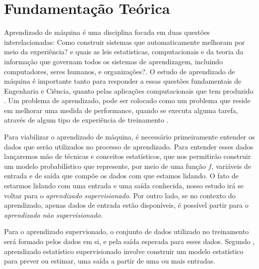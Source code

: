 \chapter{Fundamentação Teórica}

Aprendizado de máquina é uma disciplina focada em duas questões interelacionadas: Como construir sistemas que automaticamente melhoram por meio da experiência? e quais as leis estatisticas,
computacionais e da teoria da informação que governam todos os sistemas de aprendizagem, incluindo computadores, seres humanos, e organizações?. O estudo de aprendizado de máquina é importante tanto
para responder a essas questões fundamentais de Engenharia e Ciência, quanto pelas aplicações computacionais que tem produzido \cite{Jordan}.
Um problema de aprendizado, pode ser colocado como um problema que reside em melhorar uma medida de performance, quando se executa alguma tarefa, através de algum tipo de experiência de treinamento \cite{Jordan}.

Para viabilizar o aprendizado de máquina, é necessário primeiramente entender os dados que serão utilizados no processo de aprendizado. Para entender esses dados
lançaremos mão de técnicas e conceitos estatísticos, que nos permitirão construir um modelo probabilístico que represente, por meio de uma função $f$, variáveis de entrada e de saída que compõe os dados com que estamos lidando. O fato de estarmos lidando com uma entrada e uma saída conhecida, nosso estudo irá se voltar para o \textit{aprendizado supervisionado}. Por outro lado, se no contexto do aprendizado, apenas dados de entrada estão disponíveis, é possível partir para o \textit{aprendizado não supervisionado}. 

Para o aprendizado supervionado, o conjunto de dados utilizado no treinamento será formado pelos dados em si, e pela saída esperada para esses dados\cite{Louridas}. Segundo \cite{James}, aprendizado estatístico supervisionado involve construir um modelo estatístico para prever ou estimar, uma saída a partir de uma ou mais entradas.



